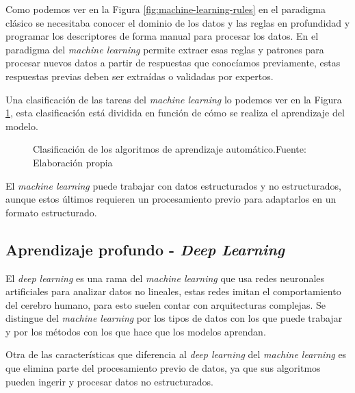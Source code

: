 Como podemos ver en la Figura \ref{fig:machine-learning-rules} en el paradigma clásico se necesitaba conocer el dominio de los datos y las reglas en profundidad y programar los descriptores de forma manual para procesar los datos. En el paradigma del \textit{machine learning} permite extraer esas reglas y patrones para procesar nuevos datos a partir de respuestas que conocíamos previamente, estas respuestas previas deben ser extraídas o validadas por expertos.

Una clasificación de las tareas del \textit{machine learning} lo podemos ver en la Figura \ref{fig:machine-learning}, esta clasificación está dividida en función de cómo se realiza el aprendizaje del modelo.

\begin{figure}[H]
    \centering
    \centerline{}
    \caption{Clasificación de los algoritmos de aprendizaje automático.\newline{}Fuente: Elaboración propia}
    \label{fig:machine-learning}
\end{figure}

El \textit{machine learning} puede trabajar con datos estructurados y no estructurados, aunque estos últimos requieren un procesamiento previo para adaptarlos en un formato estructurado.


\subsection{Aprendizaje profundo - \textit{Deep Learning}}

El \textit{deep learning} es una rama del \textit{machine learning} que usa redes neuronales artificiales para analizar datos no lineales, estas redes imitan el comportamiento del cerebro humano, para esto suelen contar con arquitecturas complejas.
Se distingue del \textit{machine learning} por los tipos de datos con los que puede trabajar y por los métodos con los que hace que los modelos aprendan.

Otra de las características que diferencia al \textit{deep learning} del \textit{machine learning} es que elimina parte del procesamiento previo de datos, ya que sus algoritmos pueden ingerir y procesar datos no estructurados.


